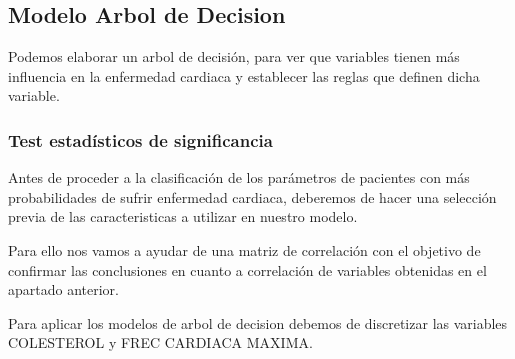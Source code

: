 \documentclass[
]{article}
\begin{document}
\hypertarget{modelo-arbol-de-decision}{%
\subsection{Modelo Arbol de Decision}\label{modelo-arbol-de-decision}}

Podemos elaborar un arbol de decisión, para ver que variables tienen más
influencia en la enfermedad cardiaca y establecer las reglas que definen
dicha variable.

\hypertarget{test-estaduxedsticos-de-significancia}{%
\subsubsection{Test estadísticos de
significancia}\label{test-estaduxedsticos-de-significancia}}

Antes de proceder a la clasificación de los parámetros de pacientes con
más probabilidades de sufrir enfermedad cardiaca, deberemos de hacer una
selección previa de las caracteristicas a utilizar en nuestro modelo.

Para ello nos vamos a ayudar de una matriz de correlación con el
objetivo de confirmar las conclusiones en cuanto a correlación de
variables obtenidas en el apartado anterior.

Para aplicar los modelos de arbol de decision debemos de discretizar las
variables COLESTEROL y FREC CARDIACA MAXIMA.
\end{document}
